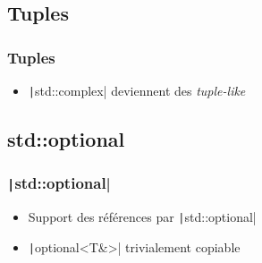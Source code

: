 \documentclass[C++.tex]{subfiles}
\begin{document}
\subsection*{Tuples}
\begin{frame}[fragile]
	\frametitle{Tuples}
	\begin{itemize}
		\item \texttt|std::complex| deviennent des \textit{tuple-like}
	\end{itemize}


\end{frame}

\subsection*{std::optional}
\begin{frame}[fragile]
	\frametitle{\texttt|std::optional|}
	\begin{itemize}
		\item Support des références par \texttt|std::optional|
		\item \texttt|optional<T&>| trivialement copiable
	\end{itemize}

\end{frame}
\end{document}
